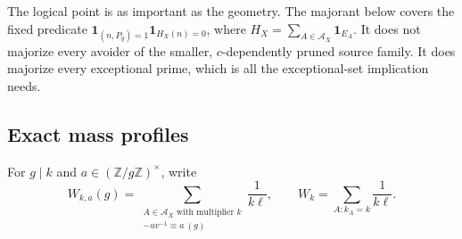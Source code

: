 \documentclass[10pt,reqno]{amsart}
\theoremstyle{definition}
\newcommand{\1}{\mathbf 1}
\begin{document}
The logical point is as important as the geometry.  The majorant below
covers the fixed predicate
$\mathbf1_{(n,P_y)=1}\mathbf1_{H_X(n)=0}$, where
$H_X=\sum_{A\in\mathcal A_X}\mathbf1_{E_A}$.  It does not majorize every
avoider of the smaller, $c$-dependently pruned source family.  It does
majorize every exceptional prime, which is all the exceptional-set
implication needs.

\subsection{Exact mass profiles}
For $g\mid k$ and $a\in(\mathbb Z/g\mathbb Z)^\times$, write
\begin{equation}\tag{39.6}
 W_{k,a}(g)=
 \sum_{\substack{A\in\mathcal A_X\text{ with multiplier }k\\
                  -uv^{-1}\equiv a\ (g)}}\frac1{k\ell},
 \qquad W_k=\sum_{A:k_A=k}\frac1{k\ell}.
\end{equation}
\end{document}
